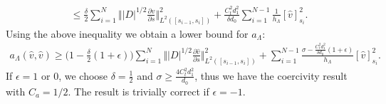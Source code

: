 \documentclass[pdflatex,sn-mathphys-num]{sn-jnl}%
\theoremstyle{thmstyleone}%
\theoremstyle{thmstyletwo}%
\theoremstyle{thmstylethree}%
\begin{document}
\begin{appendices}
\begin{align*}
    &\leq  \frac{\delta}{2}\sum_{i=1}^{N} \Vert |D|^{1/2} \frac{\partial \hat v}{\partial s} \Vert^2_{L^2([s_{i-1},s_i])} + \frac{C_t^2 d_1^2 }{\delta d_0}  \sum_{i=1}^{N-1} \frac{1}{h_\Lambda} [\hat v]^2_{s_i}.
\end{align*}
Using the above inequality we obtain a lower bound for $a_\Lambda$:
\begin{align*}
    a_\Lambda (\hat v, \hat v) \geq \Big(1-\frac{\delta}{2}(1+ \epsilon)\Big)
    \sum_{i=1}^{N} \Vert |D|^{1/2} \frac{\partial \hat v}{\partial s} \Vert^2_{L^2([s_{i-1},s_i])}
     + \sum_{i=1}^{N-1} \frac{\sigma - \frac{C_t^2 d_1^2}{\delta d_0}(1+\epsilon)}{h_\Lambda} [\hat v]^2_{s_i}.
\end{align*}
If $\epsilon = 1$ or $0$, we choose $\delta =\frac{1}{2}$ and $\sigma \geq \frac{4C_t^2 d_1^2 }{ d_0} $, thus we have the coercivity result with $C_a = 1/2$. 
The result is trivially correct if $\epsilon = -1$.


\end{appendices}
\end{document}
